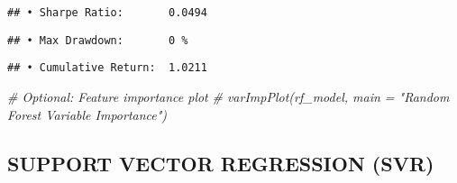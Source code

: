 \documentclass[
]{article}
\newenvironment{Shaded}{\begin{snugshade}}{\end{snugshade}}
\newcommand{\CommentTok}[1]{\textcolor[rgb]{0.56,0.35,0.01}{\textit{#1}}}
\newcommand{\DecValTok}[1]{\textcolor[rgb]{0.00,0.00,0.81}{#1}}
\newcommand{\FunctionTok}[1]{\textcolor[rgb]{0.13,0.29,0.53}{\textbf{#1}}}
\newcommand{\NormalTok}[1]{#1}
\newcommand{\SpecialCharTok}[1]{\textcolor[rgb]{0.81,0.36,0.00}{\textbf{#1}}}
\newcommand{\StringTok}[1]{\textcolor[rgb]{0.31,0.60,0.02}{#1}}
\begin{document}
\begin{verbatim}
## • Sharpe Ratio:       0.0494
\end{verbatim}

\begin{Shaded}
\end{Shaded}

\begin{verbatim}
## • Max Drawdown:       0 %
\end{verbatim}

\begin{Shaded}
\end{Shaded}

\begin{verbatim}
## • Cumulative Return:  1.0211
\end{verbatim}

\begin{Shaded}
\begin{Highlighting}[]
\CommentTok{\# Optional: Feature importance plot}
\CommentTok{\# varImpPlot(rf\_model, main = "Random Forest Variable Importance")}
\end{Highlighting}
\end{Shaded}

\subsection{SUPPORT VECTOR REGRESSION
(SVR)}\label{support-vector-regression-svr}
\end{document}
